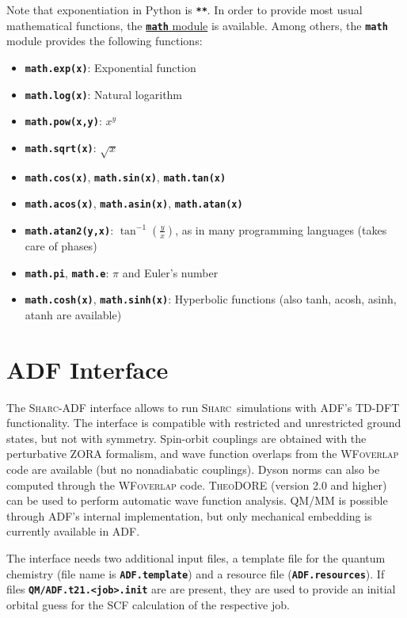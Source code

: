\documentclass[a4paper,10pt,DIV=15,openany]{scrbook}
\newcommand{\link}[2]{\href{#1}{#2}}
\newcommand{\sharc}{\textsc{Sharc}}
\newcommand{\ttt}[1]{\textbf{\texttt{#1}}}
\begin{document}
Note that exponentiation in Python is \ttt{**}. In order to provide most usual mathematical functions, the \link{https://docs.python.org/2/library/math.html}{\ttt{math} module} is available. Among others, the \ttt{math} module provides the following functions:
\begin{itemize}
  \item \ttt{math.exp(x)}: Exponential function
  \item \ttt{math.log(x)}: Natural logarithm
  \item \ttt{math.pow(x,y)}: $x^y$
  \item \ttt{math.sqrt(x)}: $\sqrt{x}$
  \item \ttt{math.cos(x)}, \ttt{math.sin(x)}, \ttt{math.tan(x)}
  \item \ttt{math.acos(x)}, \ttt{math.asin(x)}, \ttt{math.atan(x)}
  \item \ttt{math.atan2(y,x)}: $\tan^{-1}\left(\frac{y}{x}\right)$, as in many programming languages (takes care of phases)
  \item \ttt{math.pi}, \ttt{math.e}: $\pi$ and Euler's number
  \item \ttt{math.cosh(x)}, \ttt{math.sinh(x)}: Hyperbolic functions (also tanh, acosh, asinh, atanh are available)
\end{itemize}




\section{ADF Interface}\label{sec:int:adf}

The \sharc-ADF interface allows to run \sharc\ simulations with ADF's TD-DFT functionality.
The interface is compatible with restricted and unrestricted ground states, but not with symmetry.
Spin-orbit couplings are obtained with the perturbative ZORA formalism, and wave function overlaps from the \textsc{WFoverlap} code are available (but no nonadiabatic couplings).
Dyson norms can also be computed through the \textsc{WFoverlap} code.
\textsc{TheoDORE} (version 2.0 and higher) can be used to perform automatic wave function analysis.
QM/MM is possible through ADF's internal implementation, but only mechanical embedding is currently available in ADF.

The interface needs two additional input files, a template file for the quantum chemistry (file name is \ttt{ADF.template}) and a resource file (\ttt{ADF.resources}). 
If files \ttt{QM/ADF.t21.<job>.init} are are present, they are used to provide an initial orbital guess for the SCF calculation of the respective job.
\end{document}
